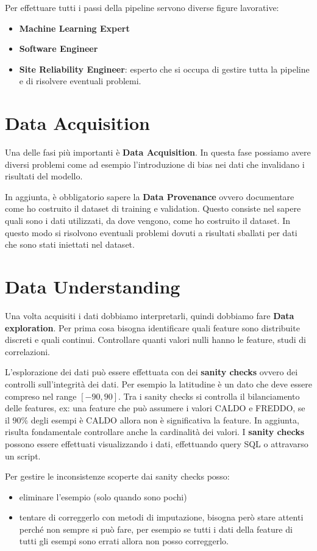 Per effettuare tutti i passi della pipeline servono diverse figure lavorative:
\begin{itemize}
    \item \textbf{Machine Learning Expert}
    \item \textbf{Software Engineer}
    \item \textbf{Site Reliability Engineer}: esperto che si occupa di gestire
          tutta la pipeline e di risolvere eventuali problemi.
\end{itemize}
\section{Data Acquisition}
Una delle fasi più importanti è \textbf{Data Acquisition}. In questa fase possiamo
avere diversi problemi come ad esempio l'introduzione di bias nei dati che
invalidano i risultati del modello.

In aggiunta, è obbligatorio sapere la \textbf{Data Provenance} ovvero documentare
come ho costruito il dataset di training e validation. Questo consiste nel sapere
quali sono i dati utilizzati, da dove vengono, come ho costruito il dataset. In
questo modo si risolvono eventuali problemi dovuti a risultati sballati per dati
che sono stati iniettati nel dataset.

\section{Data Understanding}
Una volta acquisiti i dati dobbiamo interpretarli, quindi dobbiamo fare \textbf{Data 
exploration}. Per prima cosa bisogna identificare quali feature sono distribuite 
discreti e quali continui. Controllare quanti valori nulli hanno le feature, 
studi di correlazioni.

L'esplorazione dei dati può essere effettuata con dei \textbf{sanity checks} ovvero dei 
controlli sull'integrità dei dati. Per esempio la latitudine è un dato che deve 
essere compreso nel range $[-90,90]$. Tra i sanity checks si controlla il bilanciamento 
delle features, ex: una feature che può assumere i valori CALDO e FREDDO, se 
il $90\%$ degli esempi è CALDO allora non è significativa la feature. In aggiunta,
risulta fondamentale controllare anche la cardinalità dei valori.
I \textbf{sanity checks} possono essere effettuati visualizzando i dati, effettuando 
query SQL o attravarso un script.

Per gestire le inconsistenze scoperte dai sanity checks posso:
\begin{itemize}
    \item eliminare l'esempio (solo quando sono pochi)
    \item tentare di correggerlo con metodi di imputazione, bisogna però stare 
    attenti perché non sempre si può fare, per esempio se tutti i dati della feature
    di tutti gli esempi sono errati allora non posso correggerlo.
\end{itemize}

